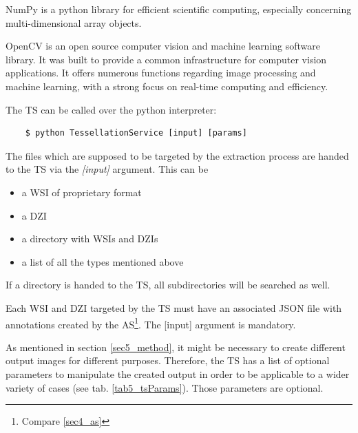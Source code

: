 NumPy is a python library for efficient scientific computing, especially concerning multi-dimensional array objects\cite{Walt11}.

OpenCV  is an open source computer vision and machine learning software library. It was built to provide a common infrastructure for computer vision applications. It offers numerous functions regarding image processing and machine learning, with a strong focus on real-time computing and efficiency\cite{Bradski08}.

The TS can be called over the python interpreter:

\begin{lstlisting}
	$ python TessellationService [input] [params]
\end{lstlisting}

The files which are supposed to be targeted by the extraction process are handed to the TS via the \emph{[input]} argument. This can be
\begin{itemize}
	\item a WSI of proprietary format
	\item a DZI
	\item a directory with WSIs and DZIs
	\item a list of all the types mentioned above
\end{itemize}

If a directory is handed to the TS, all subdirectories will be searched as well.

Each WSI and DZI targeted by the TS must have an associated JSON file with annotations created by the AS\footnote{
	Compare \ref{sec4_as}
}. The [input] argument is mandatory.

As mentioned in section \ref{sec5_method}, it might be necessary to create different output images for different purposes. Therefore, the TS has a list of optional parameters to manipulate the created output in order to be applicable to a wider variety of cases (see tab. \ref{tab5_tsParams}). Those parameters are optional. 

